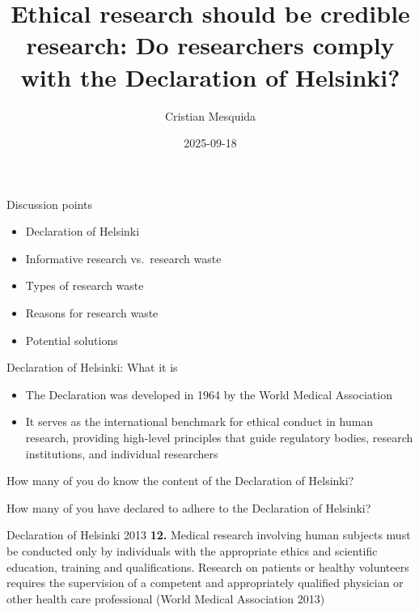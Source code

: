 \documentclass[
  ignorenonframetext,
]{beamer}
\title{\texorpdfstring{Ethical research should be credible research: Do
researchers comply with the Declaration of
Helsinki?}{Ethical research should be credible research: Do researchers comply with the Declaration of Helsinki?}}
\author{\texorpdfstring{Cristian Mesquida}{Cristian Mesquida}}
\date{2025-09-18}
\institute{Eindhoven University of Technology}
\begin{document}
\frame{\titlepage}

\begin{frame}{Discussion points}
\protect{}\label{discussion-points}
\begin{itemize}
\item
  Declaration of Helsinki
\item
  Informative research vs.~research waste
\item
  Types of research waste
\item
  Reasons for research waste
\item
  Potential solutions
\end{itemize}
\end{frame}

\begin{frame}{Declaration of Helsinki: What it is}
\protect{}\label{declaration-of-helsinki-what-it-is}
\begin{itemize}
\item
  The Declaration was developed in 1964 by the World Medical Association
\item
  It serves as the international benchmark for ethical conduct in human
  research, providing high-level principles that guide regulatory
  bodies, research institutions, and individual researchers
\end{itemize}

\begin{block}{}
\protect{}\label{section}
How many of you do know the content of the Declaration of Helsinki?
\end{block}

\begin{block}{}
\protect{}\label{section-1}
How many of you have declared to adhere to the Declaration of Helsinki?
\end{block}
\end{frame}

\begin{frame}{Declaration of Helsinki 2013}
\protect{}\label{declaration-of-helsinki-2013}
\textbf{12.} Medical research involving human subjects must be conducted
only by individuals with the appropriate ethics and scientific
education, training and qualifications. Research on patients or healthy
volunteers requires the supervision of a competent and appropriately
qualified physician or other health care professional (World Medical
Association 2013)
\end{frame}
\end{document}
